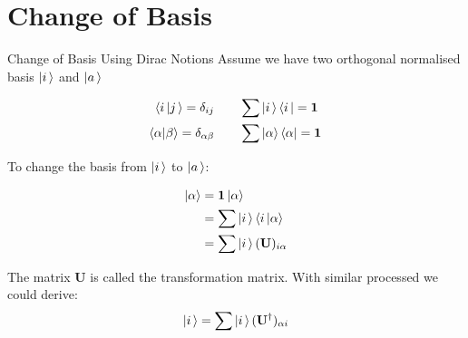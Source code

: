 \documentclass[aspectratio=169,10pt,compress,t]{ctexbeamer}
\begin{document}
\section{Change of Basis}

\begin{frame}{Change of Basis Using Dirac Notions}
Assume we have two orthogonal normalised basis {$\ket{i\,}$} and {$\ket{a\,}$}

\begin{equation*}
\begin{aligned}
  \braket{i\,|j\,} = \delta_{ij} \quad & \quad \sum \ket{i\,}\bra{i\,} = \mathbf{1} \\
  \braket{\alpha|\beta} = \delta_{\alpha\beta} \quad & \quad \sum \ket{\alpha}\bra{\alpha} = \mathbf{1}
\end{aligned}
\end{equation*}

To change the basis from {$\ket{i\,}$} to {$\ket{a\,}$}:

\begin{equation*}
\begin{aligned}
  \ket{\alpha} &= \mathbf{1} \ket{\alpha} \\
  &= \sum \ket{i\,}\braket{i\,| \alpha} \\
  &= \sum \ket{i\,}(\mathbf{U})_{i\alpha}
\end{aligned}
\end{equation*}

The matrix $\mathbf{U}$ is called the transformation matrix.
With similar processed we could derive:
$$\ket{i\,} = \sum \ket{i\,}(\mathbf{U}^\dagger)_{\alpha i} $$

\end{frame}
\end{document}
